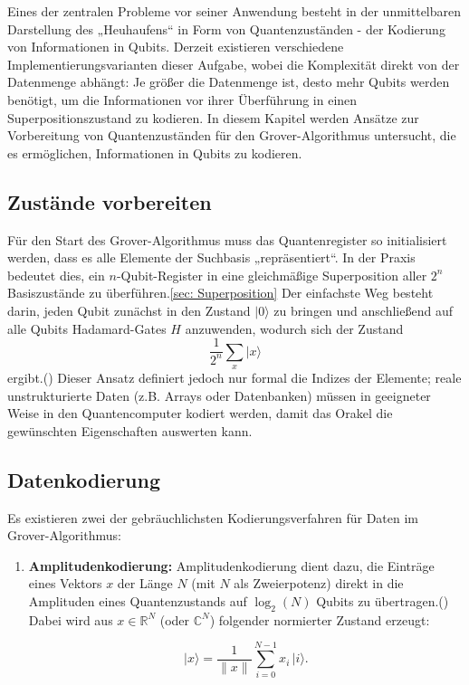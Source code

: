 {Eines der zentralen Probleme vor seiner Anwendung besteht in der unmittelbaren Darstellung des „Heuhaufens“ in Form von Quantenzuständen - der Kodierung von Informationen in Qubits. Derzeit existieren verschiedene Implementierungsvarianten dieser Aufgabe, wobei die Komplexität direkt von der Datenmenge abhängt: Je größer die Datenmenge ist, desto mehr Qubits werden benötigt, um die Informationen vor ihrer Überführung in einen Superpositionszustand zu kodieren. In diesem Kapitel werden Ansätze zur Vorbereitung von Quantenzuständen für den Grover-Algorithmus untersucht, die es ermöglichen, Informationen in Qubits zu kodieren.

\subsection{Zustände vorbereiten}
Für den Start des Grover-Algorithmus muss das Quantenregister so initialisiert werden, dass es alle Elemente der Suchbasis „repräsentiert“. In der Praxis bedeutet dies, ein \(n\)-Qubit-Register in eine gleichmäßige Superposition aller \(2^n\) Basiszustände zu überführen.\ref{sec: Superposition} Der einfachste Weg besteht darin, jeden Qubit zunächst in den Zustand \(\lvert 0\rangle\) zu bringen und anschließend auf alle Qubits Hadamard-Gates \(H\) anzuwenden, wodurch sich der Zustand  
\[
\frac{1}{2^{n}}\sum_{x}\lvert x\rangle
\]
ergibt.(\cite{miguel_a_naranjo_review_2024}) Dieser Ansatz definiert jedoch nur formal die Indizes der Elemente; reale unstrukturierte Daten (z.B. Arrays oder Datenbanken) müssen in geeigneter Weise in den Quantencomputer kodiert werden, damit das Orakel die gewünschten Eigenschaften auswerten kann.

\subsection{Datenkodierung}
Es existieren zwei der gebräuchlichsten Kodierungsverfahren für Daten im Grover-Algorithmus:  
\begin{enumerate}  
  \item \textbf{Amplitudenkodierung:}  
Amplitudenkodierung dient dazu, die Einträge eines Vektors $x$ der Länge $N$ (mit $N$ als Zweierpotenz) direkt in die Amplituden eines Quantenzustands auf $\log_2(N)$ Qubits zu übertragen.(\cite{alessandro_luongo_quantum_2024}) Dabei wird aus $x\in\mathbb{R}^N$ (oder $\mathbb{C}^N$) folgender normierter Zustand erzeugt:

$$
\lvert x\rangle
=\frac{1}{\|x\|}\sum_{i=0}^{N-1}x_i\,\lvert i\rangle.
$$


\end{enumerate}}
